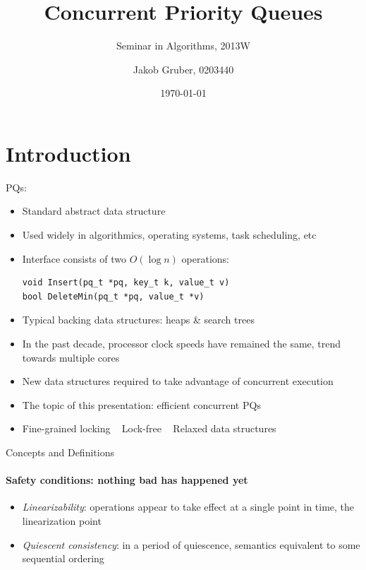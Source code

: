 \documentclass[usenames,dvipsnames]{beamer}
\title{Concurrent Priority Queues}
\subtitle{Seminar in Algorithms, 2013W}
\author{Jakob Gruber, 0203440}
\date{\today}
\begin{document}
\maketitle

\section{Introduction} \label{sec:intro}

\begin{frame}{}
\acp{PQ}:

\begin{itemize}
\item Standard abstract data structure
\item Used widely in algorithmics, operating systems, task scheduling, etc
\item Interface consists of two $O(\log n)$ operations:

\begin{lstlisting}
void Insert(pq_t *pq, key_t k, value_t v)
bool DeleteMin(pq_t *pq, value_t *v)
\end{lstlisting}

\item Typical backing data structures: heaps \& search trees
\end{itemize}

\framebreak

\begin{itemize}
\item In the past decade, processor clock speeds have remained the same, trend towards multiple cores
\item New data structures required to take advantage of concurrent execution
\item The topic of this presentation: efficient concurrent \acp{PQ}
\item Fine-grained locking \textrightarrow ~ Lock-free \textrightarrow ~ Relaxed data structures
\end{itemize}

\end{frame}

\begin{frame}{Concepts and Definitions}
\framesubtitle{Safety conditions: nothing bad has happened yet}

\begin{itemize}
\item \emph{Linearizability}: operations appear to take effect at a single point in time, the linearization point
\item \emph{Quiescent consistency}: in a period of quiescence, semantics equivalent to some sequential ordering
\end{itemize}
\end{frame}
\end{document}
